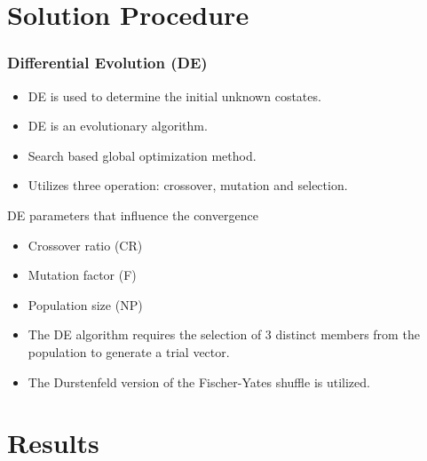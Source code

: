 \documentclass{beamer}
\begin{document}
\section{Solution Procedure}
\begin{frame}
	\frametitle{Differential Evolution (DE)}
	\begin{itemize}
		\vspace{-3mm}
		\item DE is used to determine the initial unknown costates.
		\pause
		\item DE is an evolutionary algorithm.
		\pause
		\item Search based global optimization method.
		\pause
		\item Utilizes three operation: crossover, mutation and selection.
	\end{itemize}
	\vspace{-3mm}
	\pause
	\begin{block}{DE parameters that influence the convergence}
		\vspace{-2.5mm}
		\begin{itemize}
			\item Crossover ratio (CR)
			\item Mutation factor (F)
			\item Population size (NP)
			\vspace{-2.5mm}
		\end{itemize}
	\end{block}
	\pause
	\begin{itemize}
		\vspace{-2mm}
		\item The DE algorithm requires the selection of 3 distinct members from the population to generate a trial vector. 
		\pause
		\item The Durstenfeld version of the Fischer-Yates shuffle is utilized.
	\end{itemize}
\end{frame}

\section{Results}
\end{document}
